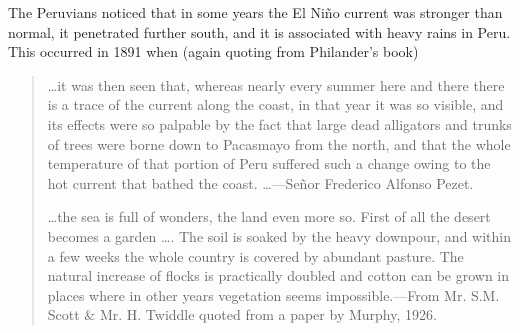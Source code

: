 The Peruvians noticed that in some years the El Ni\~{n}o current was
stronger than normal, it penetrated further south, and it is
associated with heavy rains in Peru. This occurred in 1891 when (again
quoting from Philander's book)
\begin{quotation} \small
\ldots it was then seen that, whereas nearly every summer here and
there there is a trace of the current along the coast, in that year it
was so visible, and its effects were so palpable by the fact that
large dead alligators and trunks of trees were borne down to Pacasmayo
from the north, and that the whole temperature of that portion of Peru
suffered such a change owing to the hot current that bathed the
coast. \ldots ---Se\~{n}or Frederico Alfonso Pezet.

\ldots the sea is full of wonders, the land even more so. First of all
the desert becomes a garden \ldots . The soil is soaked by the heavy
downpour, and within a few weeks the whole country is covered by
abundant pasture. The natural increase of flocks is practically
doubled and cotton can be grown in places where in other years
vegetation seems impossible.---From Mr. S.M. Scott \& Mr. H. Twiddle
quoted from a paper by Murphy, 1926.
\end{quotation}

